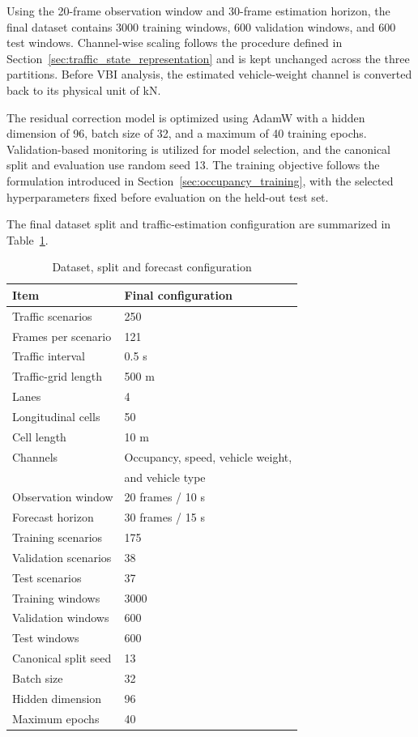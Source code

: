 \documentclass[journal]{IEEEtran}
\begin{document}
Using the 20-frame observation window and 30-frame estimation horizon, the final dataset contains 3000 training windows, 600 validation windows, and 600 test windows. Channel-wise scaling follows the procedure defined in Section~\ref{sec:traffic_state_representation} and is kept unchanged across the three partitions. Before VBI analysis, the estimated vehicle-weight channel is converted back to its physical unit of kN.

The residual correction model is optimized using AdamW with a hidden dimension of 96, batch size of 32, and a maximum of 40 training epochs. Validation-based monitoring is utilized for model selection, and the canonical split and evaluation use random seed 13. The training objective follows the formulation introduced in Section~\ref{sec:occupancy_training}, with the selected hyperparameters fixed before evaluation on the held-out test set.

The final dataset split and traffic-estimation configuration are summarized in Table~\ref{tab:dataset_configuration}.

\begin{table}[!t]
\centering
\caption{Dataset, split and forecast configuration}
\label{tab:dataset_configuration}
\footnotesize
\begin{tabular}{ll}
\toprule
\textbf{Item} & \textbf{Final configuration} \\
\midrule
Traffic scenarios & 250 \\
Frames per scenario & 121 \\
Traffic interval & 0.5 s \\
Traffic-grid length & 500 m \\
Lanes & 4 \\
Longitudinal cells & 50 \\
Cell length & 10 m \\
Channels & Occupancy, speed, vehicle weight, \\
 & and vehicle type \\
Observation window & 20 frames / 10 s \\
Forecast horizon & 30 frames / 15 s \\
Training scenarios & 175 \\
Validation scenarios & 38 \\
Test scenarios & 37 \\
Training windows & 3000 \\
Validation windows & 600 \\
Test windows & 600 \\
Canonical split seed & 13 \\
Batch size & 32 \\
Hidden dimension & 96 \\
Maximum epochs & 40 \\
\bottomrule
\end{tabular}
\end{table}
\end{document}
